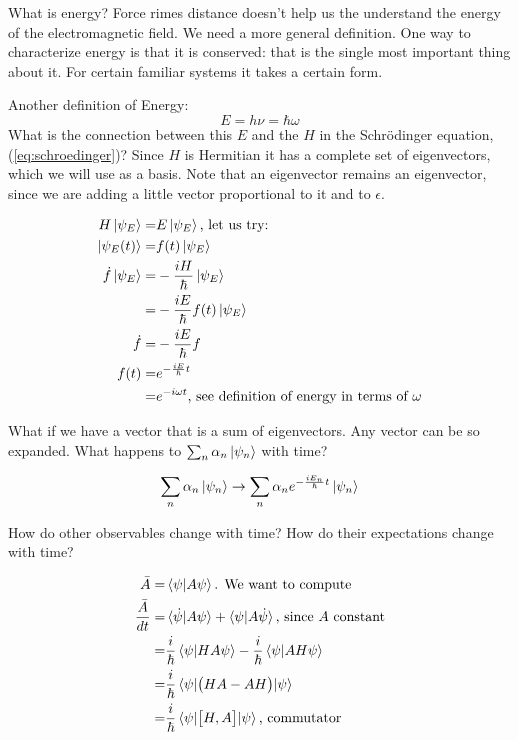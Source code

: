 \documentclass[]{article}
\begin{document}
What is energy? Force rimes distance doesn't help us the understand the energy of the electromagnetic field.  We need a more general definition. One way to characterize energy is that it is conserved: that is the single most important thing about it. For certain familiar systems it takes a certain form.

Another definition of Energy:
$$E = h\nu = \hbar \omega$$
What is the connection between this $E$ and the $H$ in the Schr\"odinger equation, (\ref{eq:schroedinger})? Since $H$ is Hermitian it has a complete set of eigenvectors, which we will use as a basis. Note that an eigenvector remains an eigenvector, since we are adding a little vector proportional to it and to $\epsilon$.

\begin{align*}
	H\ket{\psi_E} =& E\ket{\psi_E}\text{, let us try:}\\
	\ket{\psi_E(t)} =& f(t)\ket{\psi_E}\\
	\dot{f}\ket{\psi_E} =& -\frac{iH}{\hbar}\ket{\psi_E}\\
	=& -\frac{iE}{\hbar} f(t) \ket{\psi_E}\\
	\dot{f}=& -\frac{iE}{\hbar} f\\
	f(t) =& e^{-\frac{iE}{\hbar}t}\\
	=& e^{-i \omega t} \text{, see definition of energy in terms of $\omega$}
\end{align*}

What if we have a vector that is a sum of eigenvectors. Any vector can be so expanded. What happens to $\sum_n \alpha_n \ket{\psi_n}$ with time?

\begin{align*}
	\sum_n \alpha_n \ket{\psi_n} \rightarrow \sum_n \alpha_n e^{-\frac{iE_n}{\hbar}t} \ket{\psi_n}
\end{align*}

How do other observables change with time? How do their expectations change with time?

\begin{align*}
	\bar{A} =&\braket{\psi\vert A \psi}\text{. We want to compute}\\
	\frac{\bar{A}}{dt} =&	\braket{\dot{\psi}\vert A \psi} + \braket{\psi\vert A \dot{\psi}} \text{, since $A$ constant}\\
	=& \frac{i}{\hbar}\braket{\psi\vert H A \psi} - \frac{i}{\hbar}\braket{\psi\vert A H \psi}\\
	=& \frac{i}{\hbar} \braket{\psi \vert \big(HA-AH\big)\vert \psi}\\
	=& \frac{i}{\hbar} \braket{\psi \vert \big[H,A\big]\vert \psi} \text {, commutator}
\end{align*}
\end{document}
